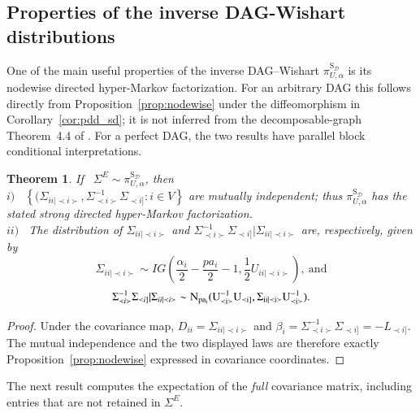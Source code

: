 \documentclass[12pt]{article}
\newcommand{\D}{\mathcal{D}}
\theoremstyle{plain}
\newtheorem{theorem}{Theorem}[section]
\theoremstyle{definition}
\theoremstyle{remark}
\begin{document}
\subsection{Properties of the inverse DAG-Wishart distributions}\label{sub:prop_wsg}
%
One of the main useful properties of the inverse DAG--Wishart
$\pi_{U,\alpha}^{\mathrm S_{\D}}$ is its nodewise directed
hyper-Markov factorization.  For an arbitrary DAG this follows directly
from Proposition~\ref{prop:nodewise} under the diffeomorphism in
Corollary~\ref{cor:pdd_sd}; it is not inferred from the decomposable-graph
Theorem~4.4 of \cite{letac07*}.  For a perfect DAG, the two results have
parallel block conditional interpretations.
%
%
\begin{theorem}\label{th:strong} If ~$\Sigma^{E}\sim {\pi}_{U,\alpha}^{\mathrm{S}_{\D}}$, then \\
 $i)$~ $\left\{(\Sigma_{ii|\prec i\succ}, \Sigma_{\prec i\succ}^{-1}\Sigma_{\prec i]}: i\in V\right\}$ are mutually independent; thus ${\pi}^{\mathrm{S}_{\D}}_{U,\alpha}$ has the stated strong directed hyper-Markov factorization.\\
 $ii)$~ The distribution of  $\Sigma_{ii|\prec i\succ}$  and  $\Sigma_{\prec i\succ}^{-1}\Sigma_{\prec i]}|\Sigma_{ii|\prec i\succ}$ are, respectively, given by
 \begin{equation}\label{hypersg1}
\Sigma_{ii|\prec i\succ}\sim IG(\frac{\alpha_i}{2}-\frac{pa_i}{2}-1,  \frac{1}{2}U_{ii|\prec i\succ}) ,~\text{and}
\end{equation}
\begin{equation}\label{hypersg2}
\Sigma_{\prec i\succ}^{-1}\Sigma_{\prec i]}|\Sigma_{ii|\prec i\succ}\sim \rm{N}_{pa_i}(U^{-1}_{\prec i\succ}U_{\prec i]}, \Sigma_{ii|\prec i\succ}U^{-1}_{\prec i\succ} ).
\end{equation}
 \end{theorem}

\begin{proof}
Under the covariance map,
$D_{ii}=\Sigma_{ii\mid\prec i\succ}$ and
$\beta_i=\Sigma_{\prec i\succ}^{-1}\Sigma_{\prec i]}=-L_{\prec i]}$.
The mutual independence and the two displayed laws are therefore
exactly Proposition~\ref{prop:nodewise} expressed in covariance
coordinates.
\end{proof}

The next result computes the expectation of the \emph{full} covariance
matrix, including entries that are not retained in \(\Sigma^E\).
\end{document}
